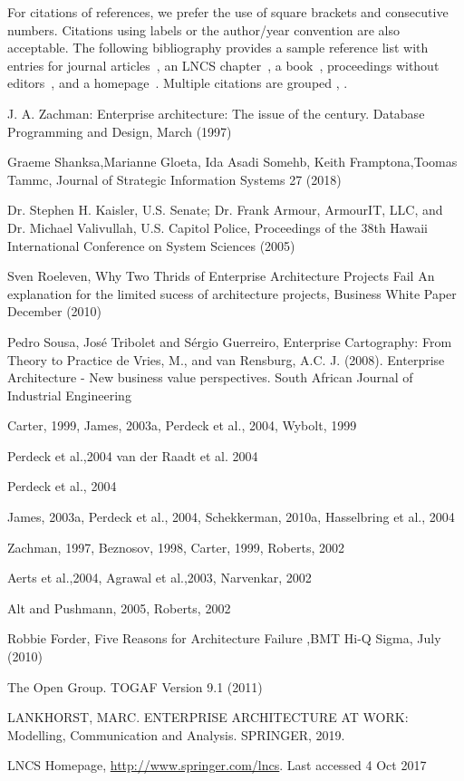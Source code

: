 \documentclass[runningheads]{llncs}
\begin{document}
For citations of references, we prefer the use of square brackets
and consecutive numbers. Citations using labels or the author/year
convention are also acceptable. The following bibliography provides
a sample reference list with entries for journal
articles~\cite{ref_1}, an LNCS chapter~\cite{ref_1}, a
book~\cite{ref_book1}, proceedings without editors~\cite{ref_1},
and a homepage~\cite{ref_url1}. Multiple citations are grouped
\cite{ref_1,ref_1,ref_1},
\cite{ref_1,ref_1,ref_1,ref_1}.
%
%
%
% 
% 
%
\begin{thebibliography}{8}
J. A. Zachman: Enterprise architecture: The issue of the century. Database Programming and Design, March (1997)

Graeme Shanksa,Marianne Gloeta, Ida Asadi Somehb, Keith Framptona,Toomas Tammc,  Journal of Strategic Information Systems 27 (2018)

Dr. Stephen H. Kaisler, U.S. Senate; Dr. Frank Armour, ArmourIT, LLC, and Dr. Michael Valivullah, U.S. Capitol Police, Proceedings of the 38th Hawaii International Conference on System Sciences (2005)

Sven Roeleven, Why Two Thrids of Enterprise Architecture Projects Fail An explanation for the limited sucess of architecture projects, Business White Paper December (2010)

Pedro Sousa, José Tribolet and Sérgio Guerreiro, Enterprise Cartography: From Theory to Practice
de Vries, M., and van Rensburg, A.C. J. (2008). Enterprise Architecture - New business value perspectives. South African Journal of Industrial Engineering

Carter, 1999, James, 2003a, Perdeck et al., 2004, Wybolt, 1999

Perdeck et al.,2004 van der Raadt et al. 2004

Perdeck et al., 2004

James, 2003a, Perdeck et al., 2004, Schekkerman, 2010a, Hasselbring et al., 2004

Zachman, 1997, Beznosov, 1998, Carter, 1999, Roberts, 2002

Aerts et al.,2004, Agrawal et al.,2003, Narvenkar, 2002

Alt and Pushmann, 2005, Roberts, 2002

Robbie Forder, Five Reasons for Architecture Failure ,BMT Hi-Q Sigma, July (2010)

The Open Group. TOGAF Version 9.1 (2011)

LANKHORST, MARC. ENTERPRISE ARCHITECTURE AT WORK: Modelling, Communication and Analysis. SPRINGER, 2019.

LNCS Homepage, \url{http://www.springer.com/lncs}. Last accessed 4
Oct 2017
\end{thebibliography}
\end{document}
